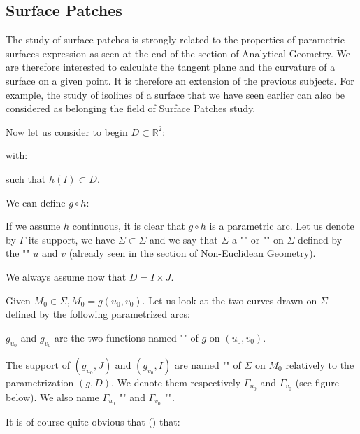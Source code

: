 {\begin{tcolorbox}[colframe=black,colback=white,sharp corners]
	\end{tcolorbox}
	
	\pagebreak
	\subsection{Surface Patches}
	The study of surface patches is strongly related to the properties of parametric surfaces expression as seen at the end of the section of Analytical Geometry. We are therefore interested to calculate the tangent plane and the curvature of a surface on a given point. It is therefore an extension of the previous subjects. For example, the study of isolines of a surface that we have seen earlier can also be considered as belonging the field of Surface Patches study.
	 
	Now let us consider to begin $D \subset \mathbb{R}^2$:
	
	with:
	
	such that $h(I)\subset D$.

	We can define $g\circ h$:
	
	If we assume $h$ continuous, it is clear that $g\circ h$ is a parametric arc. Let us denote by $\Gamma$ its support, we have $\Sigma \subset \Sigma$ and we say that $\Sigma$ a "" or "" on $\Sigma$ defined by the "" $u$ and $v$ (already seen in the section of Non-Euclidean Geometry).
	
	\begin{tcolorbox}[title=Remark,colframe=black,arc=10pt]
	We always assume now that $D=I\times J$.
	\end{tcolorbox}
	Given $M_0 \in \Sigma, M_0=g(u_0,v_0)$. Let us look at the two curves drawn on $\Sigma$ defined by the following parametrized arcs:
	
	$g_{u_0}$ and $g_{v_0}$ are the two functions named "" of $g$ on $(u_0,v_0)$.
	
	The support of $(g_{u_0},J)$ and $(g_{v_0},I)$ are named "" of $\Sigma$ on $M_0$ relatively to the parametrization $(g,D)$. We denote them  respectively $\Gamma_{u_0}$ and $\Gamma_{v_0}$ (see figure below). We also name $\Gamma_{u_0}$ "" and $\Gamma_{v_0}$ "".
	
	It is of course quite obvious that () that:
	
}
